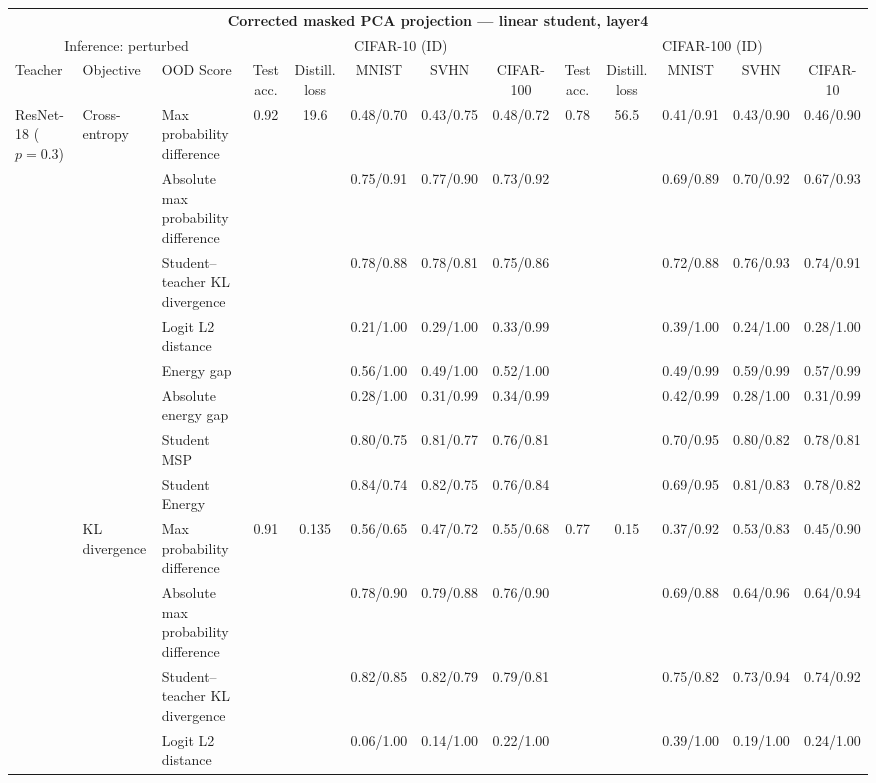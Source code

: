 \documentclass[border=2pt]{standalone}
\begin{document}
\scriptsize
\setlength{\tabcolsep}{3pt}
\begin{tabular}{lllcccccccccc}
\multicolumn{13}{c}{\textbf{Corrected masked PCA projection --- linear student, layer4}}\\[4pt]
\multicolumn{3}{c}{Inference: perturbed} & \multicolumn{5}{c}{CIFAR-10 (ID)} & \multicolumn{5}{c}{CIFAR-100 (ID)} \\
\cmidrule(lr){4-8} \cmidrule(lr){9-13}
\toprule
Teacher & Objective & OOD Score & Test acc. & Distill. loss & MNIST & SVHN & CIFAR-100 & Test acc. & Distill. loss & MNIST & SVHN & CIFAR-10 \\
\midrule
ResNet-18 ($p=0.3$) & Cross-entropy & Max probability difference & 0.92 & 19.6 & 0.48/0.70 & 0.43/0.75 & 0.48/0.72 & 0.78 & 56.5 & 0.41/0.91 & 0.43/0.90 & 0.46/0.90 \\
 &  & Absolute max probability difference &  &  & 0.75/0.91 & 0.77/0.90 & 0.73/0.92 &  &  & 0.69/0.89 & 0.70/0.92 & 0.67/0.93 \\
 &  & Student--teacher KL divergence &  &  & 0.78/0.88 & 0.78/0.81 & 0.75/0.86 &  &  & 0.72/0.88 & 0.76/0.93 & 0.74/0.91 \\
 &  & Logit L2 distance &  &  & 0.21/1.00 & 0.29/1.00 & 0.33/0.99 &  &  & 0.39/1.00 & 0.24/1.00 & 0.28/1.00 \\
 &  & Energy gap &  &  & 0.56/1.00 & 0.49/1.00 & 0.52/1.00 &  &  & 0.49/0.99 & 0.59/0.99 & 0.57/0.99 \\
 &  & Absolute energy gap &  &  & 0.28/1.00 & 0.31/0.99 & 0.34/0.99 &  &  & 0.42/0.99 & 0.28/1.00 & 0.31/0.99 \\
 &  & Student MSP &  &  & 0.80/0.75 & 0.81/0.77 & 0.76/0.81 &  &  & 0.70/0.95 & 0.80/0.82 & 0.78/0.81 \\
 &  & Student Energy &  &  & 0.84/0.74 & 0.82/0.75 & 0.76/0.84 &  &  & 0.69/0.95 & 0.81/0.83 & 0.78/0.82 \\
\addlinespace
 & KL divergence & Max probability difference & 0.91 & 0.135 & 0.56/0.65 & 0.47/0.72 & 0.55/0.68 & 0.77 & 0.15 & 0.37/0.92 & 0.53/0.83 & 0.45/0.90 \\
 &  & Absolute max probability difference &  &  & 0.78/0.90 & 0.79/0.88 & 0.76/0.90 &  &  & 0.69/0.88 & 0.64/0.96 & 0.64/0.94 \\
 &  & Student--teacher KL divergence &  &  & 0.82/0.85 & 0.82/0.79 & 0.79/0.81 &  &  & 0.75/0.82 & 0.73/0.94 & 0.74/0.92 \\
 &  & Logit L2 distance &  &  & 0.06/1.00 & 0.14/1.00 & 0.22/1.00 &  &  & 0.39/1.00 & 0.19/1.00 & 0.24/1.00 \\

\end{tabular}
\end{document}
